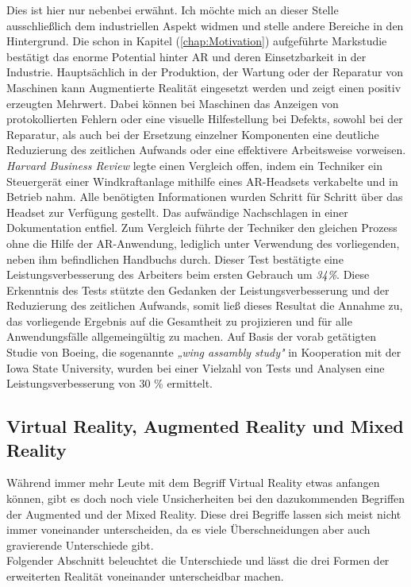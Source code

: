 Dies ist hier nur nebenbei erwähnt. Ich möchte mich an dieser Stelle ausschließlich dem industriellen Aspekt widmen und stelle andere 
Bereiche in den Hintergrund.
Die schon in Kapitel (\ref{chap:Motivation}) aufgeführte Markstudie bestätigt das enorme Potential hinter \acl{AR} und deren Einsetzbarkeit 
in der Industrie. Hauptsächlich in der Produktion, der Wartung oder der Reparatur von Maschinen kann Augmentierte Realität eingesetzt werden 
und zeigt einen positiv erzeugten Mehrwert. Dabei können bei Maschinen das Anzeigen von protokollierten Fehlern oder eine visuelle 
Hilfestellung bei Defekts, sowohl bei der Reparatur, als auch bei der Ersetzung einzelner Komponenten eine deutliche Reduzierung des 
zeitlichen Aufwands oder eine effektivere Arbeitsweise vorweisen. 
\\
\textit{Harvard Business Review} legte einen Vergleich offen, indem ein Techniker ein Steuergerät einer Windkraftanlage mithilfe 
eines \acs{AR}-Headsets verkabelte und in Betrieb nahm. Alle benötigten Informationen wurden Schritt für Schritt über das Headset zur Verfügung 
gestellt. %
Das aufwändige Nachschlagen in einer Dokumentation entfiel. %
Zum Vergleich führte der Techniker den gleichen Prozess ohne die Hilfe der AR-Anwendung, lediglich unter Verwendung des vorliegenden, neben 
ihm befindlichen Handbuchs durch.
Dieser Test bestätigte eine Leistungsverbesserung des Arbeiters beim ersten Gebrauch um \textit{34\%}.\cite{harvardbr.2017m} Diese Erkenntnis 
des Tests stützte den Gedanken der Leistungsverbesserung und der Reduzierung des zeitlichen Aufwands, somit ließ dieses Resultat die Annahme zu, 
das vorliegende Ergebnis auf die Gesamtheit zu projizieren und für alle Anwendungsfälle allgemeingültig zu machen. Auf Basis der 
vorab getätigten Studie von Boeing, die sogenannte \textit{„wing assambly study"} in Kooperation mit der Iowa State University, wurden 
bei einer Vielzahl von Tests und Analysen eine Leistungsverbesserung von 30 \% ermittelt. \cite{boeingStudy.2015a}


\subsection{Virtual Reality, Augmented Reality und Mixed Reality}
Während immer mehr Leute mit dem Begriff Virtual Reality etwas anfangen können, gibt es doch noch viele Unsicherheiten bei den dazukommenden 
Begriffen der Augmented und der Mixed Reality. Diese drei Begriffe lassen sich meist nicht immer voneinander unterscheiden, da es viele 
Überschneidungen aber auch gravierende Unterschiede gibt. 
\\ 
Folgender Abschnitt beleuchtet die Unterschiede und lässt die drei Formen der erweiterten Realität voneinander unterscheidbar machen.

